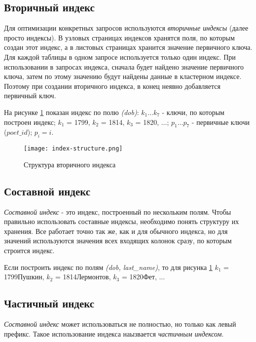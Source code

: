 \subsection{Вторичный индекс}

Для оптимизации конкретных запросов используются \textit{вторичные индексы} (далее просто индексы). В узловых страницах индексов хранятся поля, по которым создан этот индекс, а в листовых страницах хранится значение первичного ключа. Для каждой таблицы в одном запросе используется только один индекс. При использовании в запросах индекса, сначала будет найдено значение первичного ключа, затем по этому значению будут найдены данные в кластерном индексе. Поэтому при создании вторичного индекса, в конец неявно добавляется первичный ключ.

На рисунке \ref{img:index-structure} показан индекс по полю \textit{(dob)}: $k_1 \ldots k_7$ - ключи, по которым построен индекс; $k_1$ = 1799, $k_2$ = 1814, $k_3$ = 1820, $\ldots$; $p_1 \ldots p_7$ - первичные ключи ($poet\_id$); $p_i = i$.

\begin{figure}[H]
  \centering
  \texttt{[image: index-structure.png]}
  \caption{Структура вторичного индекса}
  \label{img:index-structure}
\end{figure}


\subsection{Составной индекс}

\textit{Составной индекс} - это индекс, построенный по нескольким полям. Чтобы правильно использовать составные индексы, необходимо понять структуру их хранения. Все работает точно так же, как и для обычного индекса, но для значений используются значения всех входящих колонок сразу, по которым строится индекс.

Если построить индекс по полям \textit{(dob, last_name)}, то для рисунка \ref{img:index-structure} $k_1$ = 1799Пушкин, $k_2$ = 1814Лермонтов, $k_3$ = 1820Фет, $\ldots$

\subsection{Частичный индекс}

\textit{Составной индекс} может использоваться не полностью, но только как левый префикс. Такое использование индекса наызвается \textit{частичным индексом}. 

